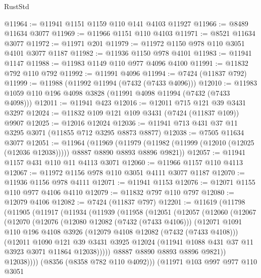 \begin{lexlean}{RustStd}
\begin{coremodule}
@11964 := @11941 @1151 @1159 @110 @141 @4103 @11927
@11966 := @8489 @11634 @3077
@11969 := @11966 @1151 @110 @4103
@11971 := @8521 @11634 @3077
@11972 := @11971 @201
@11979 := @11972 @1150 @978 @110 @3051 @4101 @3077 @1187
@11982 := @11936 @1150 @978 @4101
@11983 := @11941 @1147
@11988 := @11983 @1149 @110 @977 @4096 @4100
@11991 := @11832 @792 @110 @792
@11992 := @11991 @4096
@11994 := @7424 (@11837 @792)
@11999 := @11988 (@11992 @11994 (@7432 (@7433 @4096)))
@12010 := @11983 @1059 @110 @196 @4098 @3828 (@11991 @4098 @11994 (@7432 (@7433 @4098)))
@12011 := @11941 @423
@12016 := @12011 @715 @121 @39 @3431 @3297
@12024 := @11832 @109 @121 @109 @3431 (@7424 (@11837 @109)) @9907
@12025 := @12016 @12024
@12036 := @11941 @713 @431 @37 @11 @3295 @3071 (@11855 @712 @3295 @8873 @8877)
@12038 := @7505 @11634 @3077
@12051 := @11964
    (@11969
      (@11979 (@11982 (@11999 (@12010 (@12025 (@12036 @12038))))) @8887 @8890 @8893 @8896 @9821))
@12057 := @11941 @1157 @431 @110 @11 @4113 @3071
@12060 := @11966 @1157 @110 @4113
@12067 := @11972 @1156 @978 @110 @3051 @4111 @3077 @1187
@12070 := @11936 @1156 @978 @4111
@12071 := @11941 @1153
@12076 := @12071 @1155 @110 @977 @4106 @4110
@12079 := @11832 @797 @110 @797
@12080 := @12079 @4106
@12082 := @7424 (@11837 @797)
@12201 := @11619
    (@11798
      (@11905
        (@11917
          (@11934
            (@11939
              (@11958
                (@12051
                  (@12057
                    (@12060
                      (@12067
                        (@12070
                          (@12076
                            (@12080 @12082 (@7432 (@7433 @4106)))
                            (@12071
                              @1091
                              @110
                              @196
                              @4108
                              @3926
                              (@12079 @4108 @12082 (@7432 (@7433 @4108)))
                              (@12011
                                @1090
                                @121
                                @39
                                @3431
                                @3925
                                @12024
                                (@11941 @1088 @431 @37 @11 @3923 @3071 @11864 @12038)))))
                        @8887
                        @8890
                        @8893
                        @8896
                        @9821))
                    @12038))))
            (@8356 (@8358 @782 @110 @4092)))
          (@11971
            @103
            @997
            @977
            @110
            @3051

\end{coremodule}
\end{lexlean}
